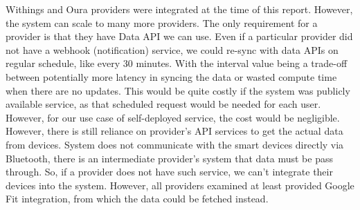 Withings and Oura providers were integrated at the time of this report. However, the system can scale to many more providers. The only requirement for a provider is that they have Data API we can use. Even if a particular provider did not have a webhook (notification) service, we could re-sync with data APIs on regular schedule, like every 30 minutes. With the interval value being a trade-off between potentially more latency in syncing the data or wasted compute time when there are no updates. This would be quite costly if the system was publicly available service, as that scheduled request would be needed for each user. However, for our use case of self-deployed service, the cost would be negligible. However, there is still reliance on provider's API services to get the actual data from devices. System does not communicate with the smart devices directly via Bluetooth, there is an intermediate provider's system that data must be pass through. So, if a provider does not have such service, we can't integrate their devices into the system. However, all providers examined at least provided Google Fit integration, from which the data could be fetched instead. 

